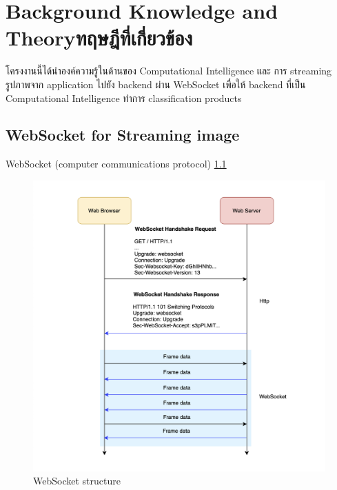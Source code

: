 \chapter{\ifenglish Background Knowledge and Theory\else ทฤษฎีที่เกี่ยวข้อง\fi}

\par โครงงานนี้ได้นำองค์ความรู้ในด้านของ Computational Intelligence และ การ streaming      
รูปภาพจาก application ไปยัง backend ผ่าน WebSocket   เพื่อให้ backend  
ที่เป็น Computational Intelligence ทำการ classification products  
  
  
\section{WebSocket for Streaming image \cite{WebSocket}}
\par WebSocket (computer communications protocol)  
 \ref{fig:WebSocket structure}
 
 
\begin{figure}[h]
\begin{center}
 
\includegraphics[scale=0.5]{pic/websocket-works-2.png}
\end{center}

\caption[WebSocket structure]{WebSocket structure}
\label{fig:WebSocket structure}
\end{figure}



